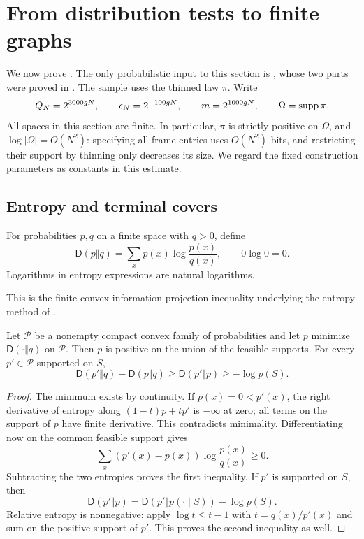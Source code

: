 \section{From distribution tests to finite graphs}\label{sec:graph-transfer}

We now prove .  The only probabilistic input to
this section is , whose two parts were
proved in .
The sample uses the thinned law \(\pi\).  Write
\begin{equation}\label{eq:transfer-scales}
 Q_N=2^{3000gN},\qquad \epsilon_N=2^{-100gN},\qquad
 m=2^{1000gN},\qquad \Omega=\operatorname{supp}\pi.
\end{equation}
All spaces in this section are finite.  In particular, \(\pi\) is
strictly positive on \(\Omega\), and
\(\log|\Omega|=O(N^2)\): specifying all frame entries uses
\(O(N^2)\) bits, and restricting their support by thinning only
decreases its size.  We regard the fixed construction parameters as
constants in this estimate.

\subsection{Entropy and terminal covers}

For probabilities \(p,q\) on a finite space with \(q>0\), define
\[
 \mathsf D(p\Vert q)=\sum_xp(x)\log\frac{p(x)}{q(x)},
 \qquad 0\log0=0.
\]
Logarithms in entropy expressions are natural logarithms.

This is the finite convex information-projection inequality underlying
the entropy method of \citet{csiszar1975}.

\begin{lemma}\label{gt:entropy}
Let \(\mathcal P\) be a nonempty compact convex family of probabilities
and let \(p\) minimize \(\mathsf D(\cdot\Vert q)\) on \(\mathcal P\).
Then \(p\) is positive on the union of the feasible supports.  For
every \(p'\in\mathcal P\) supported on \(S\),
\[
 \mathsf D(p'\Vert q)-\mathsf D(p\Vert q)
 \ge \mathsf D(p'\Vert p)\ge-\log p(S).
\]
\end{lemma}
\begin{proof}
The minimum exists by continuity.  If \(p(x)=0<p'(x)\), the
right derivative of entropy along \((1-t)p+tp'\) is \(-\infty\)
at zero; all terms on the support of \(p\) have finite derivative.
This contradicts minimality.  Differentiating now on the common
feasible support gives
\[
 \sum_x(p'(x)-p(x))\log\frac{p(x)}{q(x)}\ge0.
\]
Subtracting the two entropies proves the first inequality.  If
\(p'\) is supported on \(S\), then
\[
 \mathsf D(p'\Vert p)
 =\mathsf D(p'\Vert p(\cdot\mid S))-\log p(S).
\]
Relative entropy is nonnegative: apply \(\log t\le t-1\) with
\(t=q(x)/p'(x)\) and sum on the positive support of \(p'\).
This proves the second inequality as well.
\end{proof}

